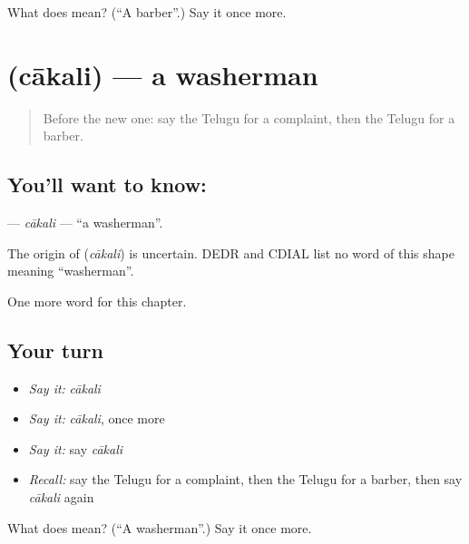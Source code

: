 \begin{tcolorbox}[breakable,colback=teal!4,colframe=teal!35!black,title={Before you move on}]
What does  mean? (\textquotedblleft{}A barber\textquotedblright{}.) Say it once more.
\end{tcolorbox}
\section[\texorpdfstring{\te{చాకలి} (cākali)}{చాకలి (cākali)}]{ (cākali) — a washerman}

\label{lesson:TE-C277-cakali}



\begin{quote}
Before the new one: say the Telugu for a complaint, then the Telugu for a barber.
\end{quote}

\subsection*{You'll want to know: }
\textbf{} — \emph{cākali} — \textquotedblleft{}a washerman\textquotedblright{}.

\begin{cousinweb}
The origin of \textbf{} (\emph{cākali}) is uncertain. DEDR and CDIAL list no word of this shape meaning \textquotedblleft{}washerman\textquotedblright{}.
\end{cousinweb}

\begin{grammarlens}[title={What you've built}]
One more word for this chapter.
\end{grammarlens}

\subsection*{Your turn}
\begin{itemize}
\raggedright
  \item \emph{Say it:} \emph{cākali}
  \item \emph{Say it:} \emph{cākali}, once more
  \item \emph{Say it:} say \emph{cākali}
  \item \emph{Recall:} say the Telugu for a complaint, then the Telugu for a barber, then say \emph{cākali} again
\end{itemize}

\begin{tcolorbox}[breakable,colback=teal!4,colframe=teal!35!black,title={Before you move on}]
What does  mean? (\textquotedblleft{}A washerman\textquotedblright{}.) Say it once more.
\end{tcolorbox}
